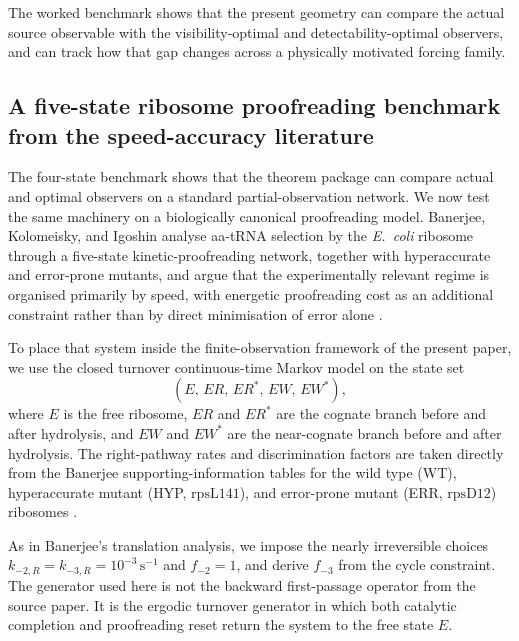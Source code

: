 \documentclass[11pt,a4paper]{article}
\numberwithin{equation}{section}
\theoremstyle{thmcompact}
\theoremstyle{remark}
\begin{document}
The worked benchmark shows that the present geometry can compare the actual source observable with the visibility-optimal and detectability-optimal observers, and can track how that gap changes across a physically motivated forcing family.


\subsection{A five-state ribosome proofreading benchmark from the speed-accuracy literature}
\label{sec:banerjee-ribosome-benchmark}

The four-state benchmark shows that the theorem package can compare actual and optimal observers on a standard partial-observation network. We now test the same machinery on a biologically canonical proofreading model. Banerjee, Kolomeisky, and Igoshin analyse aa-tRNA selection by the \emph{E.~coli} ribosome through a five-state kinetic-proofreading network, together with hyperaccurate and error-prone mutants, and argue that the experimentally relevant regime is organised primarily by speed, with energetic proofreading cost as an additional constraint rather than by direct minimisation of error alone \cite{BanerjeeKolomeiskyIgoshin2017}.

To place that system inside the finite-observation framework of the present paper, we use the closed turnover continuous-time Markov model on the state set
\begin{equation}
(E,\,ER,\,ER^{\ast},\,EW,\,EW^{\ast}),
\end{equation}
where \(E\) is the free ribosome, \(ER\) and \(ER^{\ast}\) are the cognate branch before and after hydrolysis, and \(EW\) and \(EW^{\ast}\) are the near-cognate branch before and after hydrolysis. The right-pathway rates and discrimination factors are taken directly from the Banerjee supporting-information tables for the wild type (WT), hyperaccurate mutant (HYP, \(\mathrm{rpsL141}\)), and error-prone mutant (ERR, \(\mathrm{rpsD12}\)) ribosomes \cite{BanerjeeKolomeiskyIgoshin2017}.

As in Banerjee's translation analysis, we impose the nearly irreversible choices \(k_{-2,R}=k_{-3,R}=10^{-3}\,\mathrm{s}^{-1}\) and \(f_{-2}=1\), and derive \(f_{-3}\) from the cycle constraint. The generator used here is not the backward first-passage operator from the source paper. It is the ergodic turnover generator in which both catalytic completion and proofreading reset return the system to the free state \(E\).
\end{document}
